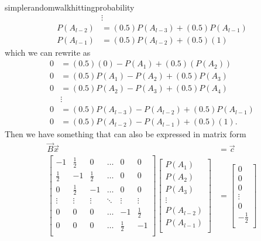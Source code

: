 \begin{answer}{simplerandomwalkhittingprobability}
\begin{align*}
 & \vdots \\
P(A_{l-2}) &= (0.5) P(A_{l-3})  + (0.5) P(A_{l-1})  \\
P(A_{l-1}) &= (0.5) P(A_{l-2})  + (0.5)(1)
\end{align*}
which we can rewrite as
\begin{align*}
0 &= (0.5)(0) - P(A_1)   + (0.5)(P(A_2)) \\
0 &= (0.5) P(A_1)  - P(A_2)  + (0.5) P(A_3)  \\
0 &= (0.5) P(A_2)  - P(A_3)  + (0.5) P(A_4)  \\
  & \vdots \\
0 &= (0.5) P(A_{l-3})  - P(A_{l-2}) + (0.5) P(A_{l-1}) \\
0 &= (0.5) P(A_{l-2})  - P(A_{l-1}) + (0.5)(1)
\text{.}
\end{align*}
Then we have something that can also be expressed in matrix form
\begin{align*}
\vec{B}\vec{x} &= \vec{c} \\
  \begin{bmatrix}
 -1           & \frac{1}{2}  & 0            &   \ldots       & 0            & 0            \\
 \frac{1}{2}  & -1           & \frac{1}{2}  &   \ldots       & 0            & 0            \\
 0            & \frac{1}{2}  & -1           &   \ldots       & 0            & 0            \\
  \vdots      & \vdots       & \vdots       &   \ddots       & \vdots       & \vdots       \\
 0            & 0            & 0            &   \ldots       & -1           & \frac{1}{2}  \\
 0            & 0            & 0            &   \ldots       & \frac{1}{2}  & -1           \\
  \end{bmatrix}
  \begin{bmatrix}
  P(A_1) \\
  P(A_2) \\
  P(A_3) \\
  \vdots \\
  P(A_{l-2}) \\
  P(A_{l-1}) \\
  \end{bmatrix}
  &=
  \begin{bmatrix}
    0 \\ 0 \\ 0 \\ \vdots \\ 0 \\ -\frac{1}{2} \\

\end{bmatrix}
\end{align*}
\end{answer}
